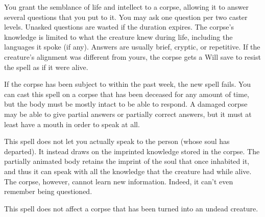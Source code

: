 \spellrng{\rngclose}
\begin{spelleffect}
You grant the semblance of life and intellect to a corpse, allowing it to answer several questions that you put to it. You may ask one question per two caster levels. Unasked questions are wasted if the duration expires. The corpse's knowledge is limited to what the creature knew during life, including the languages it spoke (if any). Answers are usually brief, cryptic, or repetitive. If the creature's alignment was different from yours, the corpse gets a Will save to resist the spell as if it were alive.
\par If the corpse has been subject to  within the past week, the new spell fails. You can cast this spell on a corpse that has been deceased for any amount of time, but the body must be mostly intact to be able to respond. A damaged corpse may be able to give partial answers or partially correct answers, but it must at least have a mouth in order to speak at all.
\par This spell does not let you actually speak to the person (whose soul has departed). It instead draws on the imprinted knowledge stored in the corpse. The partially animated body retains the imprint of the soul that once inhabited it, and thus it can speak with all the knowledge that the creature had while alive. The corpse, however, cannot learn new information. Indeed, it can't even remember being questioned.
\end{spelleffect}
\begin{spellnotes}
This spell does not affect a corpse that has been turned into an undead creature.
\end{spellnotes}

\begin{comment}
\spellsection{Spellstaff}
\spellschool{Transmutation (Imbuement) [Magic]}
\spellskill{Craft (wood), Nature}
\spelllvl{Divine 4}
\spellcmp{V, S, F}
\spelltime{10 minutes}
\spellrng{Touch}
\spelltgt{Wooden quarterstaff touched}
\spelldur{Permanent until discharged (D)}
\spellsave{Will negates (object)}
\spellsr{Yes (Will)}
\begin{spelleffect}
You store one spell that you know in a wooden quarterstaff. Only one such spell can be stored in a staff at a given time, and you cannot have more than one spellstaff at any given time. You can cast a spell stored within a staff as long as you are holding the staff, but it does not count against your normal allotment for a given day. You use up any applicable material components required to cast the spell when you store it in the spellstaff.
\end{spelleffect}
\spellfocus{The staff that stores the spell.}
\end{spellstaff}
\end{comment}

